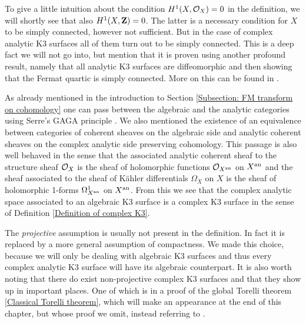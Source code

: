 \begin{remark}
    To give a little intuition about the condition $H^{1}(X, {\mathcal{O}_{X}}) = 0$ in the definition, we will shortly see that also $H^{1}(X, \mathbf Z) = 0$. The latter is a necessary condition for $X$ to be simply connected, however not sufficient. But in the case of complex analytic K3 surfaces all of them turn out to be simply connected. This is a deep fact we will not go into, but mention that it is proven using another profound result, namely that all analytic K3 surfaces are diffeomorphic and then showing that the Fermat quartic is simply connected. More on this can be found in \cite[\S 7.1]{Huybrechts2016}.
\end{remark}

As already mentioned in the introduction to Section \ref{Subsection: FM transform on cohomology} one can pass between the algebraic and the analytic categories using Serre's GAGA principle \cite{Serre1956}. We also mentioned the existence of an equivalence between categories of coherent sheaves on the algebraic side and analytic coherent sheaves on the complex analytic side preserving cohomology. This passage is also well behaved in the sense that the associated analytic coherent sheaf to the structure sheaf ${\mathcal{O}_{X}}$ is the sheaf of holomorphic functions ${\mathcal{O}_{X^{\operatorname{an}}}}$ on $X^{\operatorname{an}}$ and the sheaf associated to the sheaf of Kähler differentials $\Omega_X$ on $X$ is the sheaf of holomorphic 1-forms $\Omega^1_{X^{\operatorname{an}}}$ on $X^{\operatorname{an}}$. From this we see that the complex analytic space associated to an algebraic K3 surface is a complex K3 surface in the sense of Definition \ref{Definition of complex K3}.

\begin{remark}
    The \emph{projective} assumption is usually not present in the definition. In fact it is replaced by a more general assumption of compactness. We made this choice, because we will only be dealing with algebraic K3 surfaces and thus every complex analytic K3 surface will have its algebraic counterpart. It is also worth noting that there do exist non-projective complex K3 surfaces and that they show up in important places. One of which is in a proof of the global Torelli theorem \ref{Classical Torelli theorem}, which will make an appearance at the end of this chapter, but whose proof we omit, instead referring to \cite[\S 7]{Huybrechts2016}. 
\end{remark}









